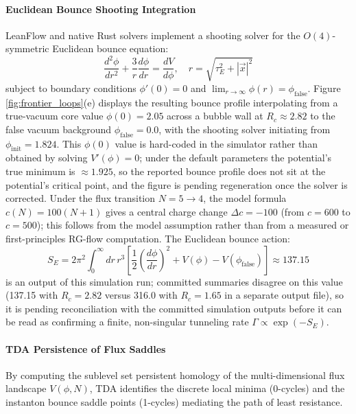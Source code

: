 \documentclass[11pt,a4paper]{article}
\newcommand{\numreconcile}[2]{#1}
\begin{document}
\paragraph{Euclidean Bounce Shooting Integration}
LeanFlow and native Rust solvers implement a shooting solver for the $O(4)$-symmetric Euclidean bounce equation:
\begin{equation}
\frac{d^2\phi}{dr^2} + \frac{3}{r}\frac{d\phi}{dr} = \frac{dV}{d\phi}, \quad r = \sqrt{\tau_E^2 + |\vec{x}|^2}
\end{equation}
subject to boundary conditions $\phi'(0) = 0$ and $\lim_{r \to \infty} \phi(r) = \phi_{\text{false}}$. Figure \ref{fig:frontier_loops}(e) displays the resulting bounce profile interpolating from a true-vacuum core value $\phi(0) = \numreconcile{2.05}{CDL true-vacuum field value}$ across a bubble wall at $R_c \approx \numreconcile{2.82}{CDL bubble wall radius}$ to the false vacuum background $\phi_{\text{false}} = 0.0$, with the shooting solver initiating from $\phi_{\text{init}} = \numreconcile{1.824}{CDL shooting initial value}$. This $\phi(0)$ value is hard-coded in the simulator rather than obtained by solving $V'(\phi) = 0$; under the default parameters the potential's true minimum is $\approx 1.925$, so the reported bounce profile does not sit at the potential's critical point, and the figure is pending regeneration once the solver is corrected. Under the flux transition $N = 5 \to 4$, the model formula $c(N) = 100(N+1)$ gives a central charge change $\Delta c = \numreconcile{-100}{flux-transition central-charge change}$ (from $c = 600$ to $c = 500$); this follows from the model assumption rather than from a measured or first-principles RG-flow computation. The Euclidean bounce action:
\begin{equation}
S_E = 2\pi^2 \int_0^\infty dr \, r^3 \left[ \frac{1}{2}\left(\frac{d\phi}{dr}\right)^2 + V(\phi) - V(\phi_{\text{false}}) \right] \approx \numreconcile{137.15}{CDL Euclidean bounce action}
\end{equation}
is an output of this simulation run; committed summaries disagree on this value (137.15 with $R_c = 2.82$ versus 316.0 with $R_c = 1.65$ in a separate output file), so it is pending reconciliation with the committed simulation outputs before it can be read as confirming a finite, non-singular tunneling rate $\Gamma \propto \exp(-S_E)$.

\paragraph{TDA Persistence of Flux Saddles}
By computing the sublevel set persistent homology of the multi-dimensional flux landscape $V(\phi, N)$, TDA identifies the discrete local minima (0-cycles) and the instanton bounce saddle points (1-cycles) mediating the path of least resistance.
\end{document}
